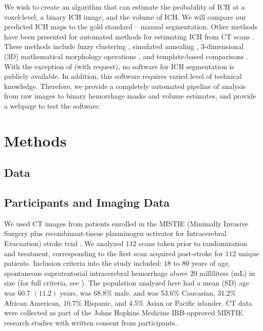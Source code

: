 We wish to create an algorithm that can estimate the probability of ICH at a voxel-level, a binary ICH image, and the volume of ICH.  We will compare our predicted ICH maps to the gold standard -- manual segmentation.  Other methods have been presented for automated methods for estimating ICH from CT scans \citep{ gillebert_automated_2014, prakash_segmentation_2012, loncaric_hierarchical_1996, loncaric_quantitative_1999, perez_set_2007}.  These methods include fuzzy clustering \citep{prakash_segmentation_2012, loncaric_hierarchical_1996}, simulated annealing \citep{loncaric_quantitative_1999}, 3-dimensional (3D) mathematical morphology operations \citep{perez_set_2007}, and template-based comparisons \citep{gillebert_automated_2014}.  With the exception of \citet{gillebert_automated_2014} (with request), no software for ICH segmentation is publicly available.  In addition, this software requires varied level of technical knowledge.  Therefore, we provide a completely automated pipeline of analysis from raw images to binary hemorrhage masks and volume estimates, and provide a webpage to test the software. 


\section{Methods}

\subsection{Data} 
\subsection{ Participants and Imaging Data }
We used CT images from patients enrolled in the MISTIE (Minimally Invasive Surgery plus recombinant-tissue plasminogen activator for Intracerebral Evacuation) stroke trial \citep{morgan_preliminary_2008_mistie}. We analyzed $112$ scans taken prior to randomization and treatment, corresponding to the first scan acquired post-stroke for $112$ unique patients.  Inclusion criteria into the study included: $18$ to $80$ years of age, spontaneous supratentorial intracerebral hemorrhage above $20$ milliliters (mL) in size (for full criteria, see \citet{mould_minimally_2013}).  The population analyzed here had a mean (SD) age was $60.7$ $(11.2)$ years, was $68.8\%$ male, and was 53.6\% Caucasian, 31.2\% African American, 10.7\% Hispanic, and 4.5\% Asian or Pacific islander.  CT data were collected as part of the Johns Hopkins Medicine IRB-approved MISTIE research studies with written consent from participants.  

